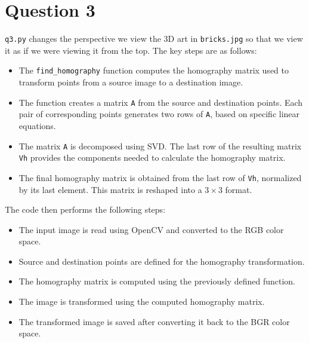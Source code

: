 \documentclass{article}
\begin{document}
\section{Question 3}
\texttt{q3.py} changes the perspective we view the 3D art in \texttt{bricks.jpg} so that we view it as if we were viewing it from the top. The key steps are as follows: 

\begin{itemize}
    \item The \texttt{find\_homography} function computes the homography matrix used to transform points from a source image to a destination image.
    \item The function creates a matrix \texttt{A} from the source and destination points. Each pair of corresponding points generates two rows of \texttt{A}, based on specific linear equations.
    \item The matrix \texttt{A} is decomposed using SVD. The last row of the resulting matrix \texttt{Vh} provides the components needed to calculate the homography matrix.
    \item The final homography matrix is obtained from the last row of \texttt{Vh}, normalized by its last element. This matrix is reshaped into a $3 \times 3$ format.
\end{itemize}


The code then performs the following steps:

\begin{itemize}
    \item The input image is read using OpenCV and converted to the RGB color space.
    \item Source and destination points are defined for the homography transformation.
    \item The homography matrix is computed using the previously defined function.
    \item The image is transformed using the computed homography matrix.
    \item The transformed image is saved after converting it back to the BGR color space.
\end{itemize}
\end{document}
